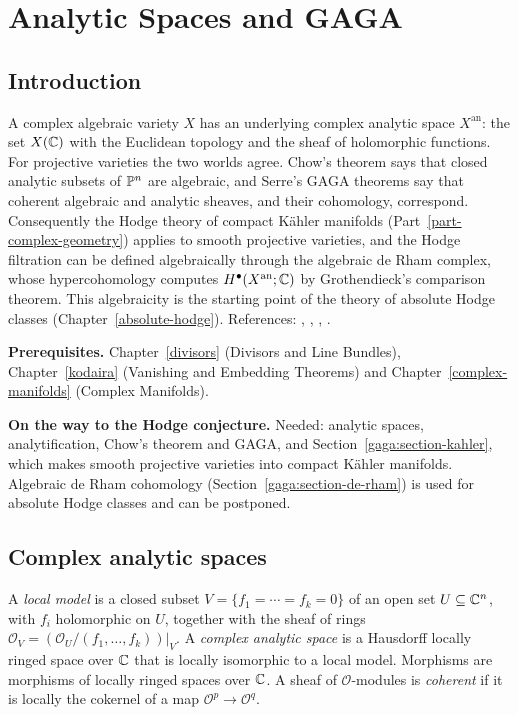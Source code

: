 \chapter{Analytic Spaces and GAGA}\label{gaga}

\section{Introduction}\label{gaga:section-introduction}

A complex algebraic variety $X$ has an underlying complex analytic space $X^{\mathrm{an}}$: the set $X(\mathbb{C})$ with the Euclidean topology and the sheaf of
holomorphic functions. For projective varieties the two worlds agree. Chow's theorem says that closed analytic subsets of $\mathbb{P}^n$ are algebraic, and
Serre's GAGA theorems say that coherent algebraic and analytic sheaves, and their cohomology, correspond. Consequently the Hodge theory of compact
K\"ahler manifolds (Part~\ref{part-complex-geometry}) applies to smooth projective varieties, and the Hodge filtration can be defined algebraically through
the algebraic de Rham complex, whose hypercohomology computes $H^\bullet(X^{\mathrm{an}}; \mathbb{C})$ by Grothendieck's comparison theorem. This algebraicity is
the starting point of the theory of absolute Hodge classes (Chapter~\ref{absolute-hodge}). References: \cite{serre-gaga}, \cite[Appendix B]{hartshorne-ag},
\cite[Chapter 1]{griffiths-harris}, \cite{grothendieck-de-rham}.

\noindent\textbf{Prerequisites.} Chapter~\ref{divisors} (Divisors and Line Bundles), Chapter~\ref{kodaira} (Vanishing and Embedding Theorems) and
Chapter~\ref{complex-manifolds} (Complex Manifolds).

\noindent\textbf{On the way to the Hodge conjecture.} Needed: analytic spaces, analytification, Chow's theorem and GAGA, and Section~\ref{gaga:section-kahler}, which makes smooth projective varieties into compact
K\"ahler manifolds. Algebraic de Rham cohomology (Section~\ref{gaga:section-de-rham}) is used for absolute Hodge classes and can be postponed.

\section{Complex analytic spaces}\label{gaga:section-analytic-spaces}

\begin{definition}\label{gaga:definition-analytic-space}
A \emph{local model} is a closed subset $V = \{f_1 = \cdots = f_k = 0\}$ of an open set $U \subseteq \mathbb{C}^n$, with $f_i$ holomorphic on $U$, together with the sheaf
of rings $\mathcal{O}_V = (\mathcal{O}_U/(f_1, \ldots, f_k))|_V$. A \emph{complex analytic space} is a Hausdorff locally ringed space over $\mathbb{C}$ that is locally isomorphic to a
local model. Morphisms are morphisms of locally ringed spaces over $\mathbb{C}$. A sheaf of $\mathcal{O}$-modules is \emph{coherent} if it is locally the cokernel of a map
$\mathcal{O}^p \to \mathcal{O}^q$.
\end{definition}

